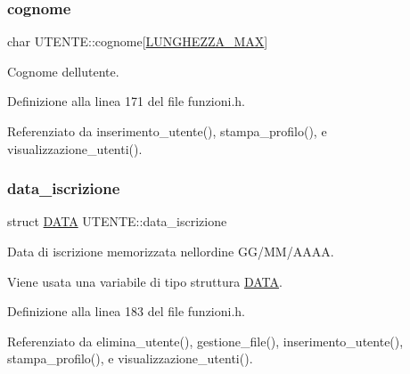 \mbox{\label{struct_u_t_e_n_t_e_ad7797bd318a25af80b02a7751ebd4b9a}} 
\subsubsection{\texorpdfstring{cognome}{cognome}}
{\footnotesize\ttfamily char U\+T\+E\+N\+T\+E\+::cognome\mbox{[}\hyperlink{funzioni_8h_a2cdd71b92d6e869f8b094e32a6da6a62}{L\+U\+N\+G\+H\+E\+Z\+Z\+A\+\_\+\+M\+AX}\mbox{]}}

Cognome dell\textquotesingle{}utente. 

Definizione alla linea 171 del file funzioni.\+h.



Referenziato da inserimento\+\_\+utente(), stampa\+\_\+profilo(), e visualizzazione\+\_\+utenti().

\mbox{\label{struct_u_t_e_n_t_e_adad490891a61a9c3d48062baa067c1e9}} 
\subsubsection{\texorpdfstring{data\+\_\+iscrizione}{data\_iscrizione}}
{\footnotesize\ttfamily struct \hyperlink{struct_d_a_t_a}{D\+A\+TA} U\+T\+E\+N\+T\+E\+::data\+\_\+iscrizione}



Data di iscrizione memorizzata nell\textquotesingle{}ordine G\+G/\+M\+M/\+A\+A\+AA. 

Viene usata una variabile di tipo struttura \hyperlink{struct_d_a_t_a}{D\+A\+TA}. 

Definizione alla linea 183 del file funzioni.\+h.



Referenziato da elimina\+\_\+utente(), gestione\+\_\+file(), inserimento\+\_\+utente(), stampa\+\_\+profilo(), e visualizzazione\+\_\+utenti().

\mbox{\label{struct_u_t_e_n_t_e_aae6578862368788ad3bbc4af47a36ee0}} 
